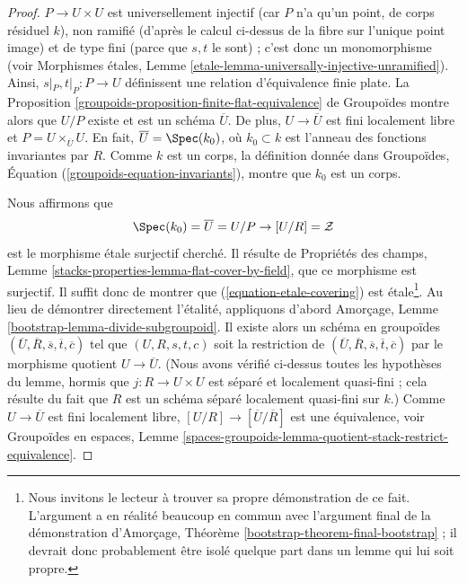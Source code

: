 \begin{proof}
$P \to U \times U$ est universellement injectif (car $P$ n'a qu'un point,
de corps résiduel $k$), non ramifié (d'après le calcul ci-dessus de la fibre
sur l'unique point image) et de type fini (parce que $s, t$ le sont) ; c'est
donc un monomorphisme (voir Morphismes étales, Lemme
\ref{etale-lemma-universally-injective-unramified}).
Ainsi, $s|_P, t|_P : P \to U$ définissent une relation d'équivalence finie
plate. La Proposition \ref{groupoids-proposition-finite-flat-equivalence} de
Groupoïdes montre alors que $U/P$ existe et est un schéma $\overline{U}$.
De plus, $U \to \overline{U}$ est fini localement libre et
$P = U \times_{\overline{U}} U$.
En fait, $\overline{U} = \Spec(k_0)$, où $k_0 \subset k$ est l'anneau des
fonctions invariantes par $R$. Comme $k$ est un corps, la définition donnée
dans Groupoïdes, Équation (\ref{groupoids-equation-invariants}), montre que
$k_0$ est un corps.

\medskip\noindent
Nous affirmons que
\begin{equation}
\label{equation-etale-covering}
\Spec(k_0) = \overline{U} = U/P \to [U/R] = \mathcal{Z}
\end{equation}
est le morphisme étale surjectif cherché. Il résulte de Propriétés des champs,
Lemme \ref{stacks-properties-lemma-flat-cover-by-field}, que ce morphisme est
surjectif. Il suffit donc de montrer que (\ref{equation-etale-covering}) est
étale\footnote{Nous invitons le lecteur à trouver sa propre démonstration de
ce fait. L'argument a en réalité beaucoup en commun avec l'argument final de
la démonstration d'Amorçage, Théorème
\ref{bootstrap-theorem-final-bootstrap} ; il devrait donc probablement être
isolé quelque part dans un lemme qui lui soit propre.}.
Au lieu de démontrer directement l'étalité, appliquons d'abord Amorçage,
Lemme \ref{bootstrap-lemma-divide-subgroupoid}. Il existe alors un schéma en
groupoïdes
$(\overline{U}, \overline{R}, \overline{s}, \overline{t}, \overline{c})$
tel que $(U, R, s, t, c)$ soit la restriction de
$(\overline{U}, \overline{R}, \overline{s}, \overline{t}, \overline{c})$
par le morphisme quotient $U \to \overline{U}$.
(Nous avons vérifié ci-dessus toutes les hypothèses du lemme, hormis que
$j : R \to U \times U$ est séparé et localement quasi-fini ; cela résulte du
fait que $R$ est un schéma séparé localement quasi-fini sur $k$.) Comme
$U \to \overline{U}$ est fini localement libre,
$[U/R] \to [\overline{U}/\overline{R}]$ est une équivalence, voir Groupoïdes
en espaces,
Lemme \ref{spaces-groupoids-lemma-quotient-stack-restrict-equivalence}.


\end{proof}
